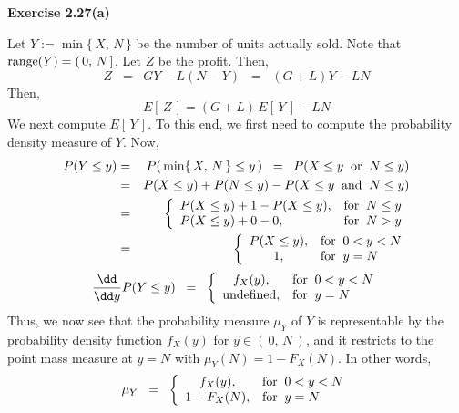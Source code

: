 
\noindent
\textbf{Exercise 2.27(a)}

\vskip 0.3cm
\noindent
Let $Y := \min\{\,X,\,N\,\}$ be the number of units actually sold.
Note that $\textnormal{range}(Y) = (\,0,\,N\,]$.
Let $Z$ be the profit.  Then,
\begin{equation*}
Z
\;\; = \;\; GY - L(N-Y)
\;\; = \;\; (G+L) Y - LN
\end{equation*}
Then,
\begin{equation*}
E[\,Z\,] = (G+L)\,E[\,Y\,] - LN
\end{equation*}
We next compute $E[\,Y\,]$.  To this end, we first need to compute the probability density measure
of $Y$.  Now,
\begin{eqnarray*}
          P(Y \leq y)
&=&       P\!\left(\,\min\{\,X,\,N\,\} \leq y\,\right)
\;\;=\;\; P(X \leq y \;\;\textnormal{or}\;\; N \leq y) \\
&=&       P(X \leq y) + P(N \leq y) - P(X \leq y \;\;\textnormal{and}\;\; N \leq y) \\
&=&       \left\{\begin{array}{ll}
          P(X \leq y) + 1 - P(X \leq y), & \textnormal{for}\;\; N \leq y \\
          P(X \leq y) + 0 - 0,           & \textnormal{for}\;\; N >    y \\
          \end{array}\right. \\
&=&       \left\{\begin{array}{cl}
          P(X \leq y), & \textnormal{for}\;\; 0 < y < N \\
          1,           & \textnormal{for}\;\; y  = N    \\
          \end{array}\right.
\end{eqnarray*}
\begin{equation*}
\dfrac{\dd}{\dd y}P(Y \leq y)
\;\;=\;\;
\left\{\begin{array}{cl}
f_{X}(y),               & \textnormal{for}\;\; 0 < y < N \\
\textnormal{undefined}, & \textnormal{for}\;\; y  = N    \\
\end{array}\right.
\end{equation*}
Thus, we now see that the probability measure $\mu_{Y}$ of $Y$ is representable by the probability
density function $f_{X}(y)$ for $y \in (\,0,\,N\,)$, and it restricts to the point mass measure
at $y = N$ with $\mu_{Y}(N) = 1 - F_{X}(N)$.  In other words,
\begin{equation*}
\mu_{Y}
\;\;=\;\;
\left\{\begin{array}{cl}
f_{X}(y),     & \textnormal{for}\;\; 0 < y < N \\
1 - F_{X}(N), & \textnormal{for}\;\; y = N \\
\end{array}\right.
\end{equation*}
